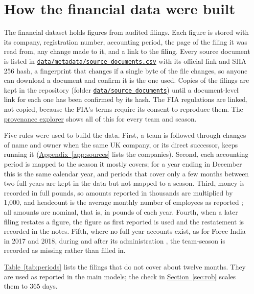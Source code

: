 \documentclass[11pt,a4paper]{article}
\newcommand{\site}{https://nahianibnat-2000.github.io/F1-moneyball}
\newcommand{\repo}{https://github.com/NahianIbnat-2000/F1-moneyball}
\newcommand{\sitepage}[2]{\href{\site/#1}{#2}}
\newcommand{\code}[1]{\href{\repo/blob/main/#1}{\nolinkurl{#1}}}
\begin{document}
\FloatBarrier
\section{How the financial data were built}
\label{app:construction}

\noindent The financial dataset holds \NFinFigures{} figures from \NFilings{} audited filings. Each figure is stored with its
company, registration number, accounting period, the page of the filing it was read from, any change made to it, and a link
to the filing. Every source document is listed in \code{data/metadata/source_documents.csv} with its official link and
SHA-256 hash, a fingerprint that changes if a single byte of the file changes, so anyone can download a document and confirm
it is the one used. Copies of the filings are kept in the repository (folder \code{data/source_documents}) until a
document-level link for each one has been confirmed by its hash. The FIA regulations are linked, not copied, because the
FIA's terms require its consent to reproduce them. The \sitepage{provenance}{provenance explorer} shows all of this for every team
and season.

Five rules were used to build the data. First, a team is followed through changes of name and owner
when the same UK company, or its direct successor, keeps running it (\hyperref[app:sources]{Appendix~\ref*{app:sources}}
lists the companies). Second, each accounting period is mapped to the season it mostly covers; for a year ending in
December this is the same calendar year, and periods that cover only a few months between two full years are kept in the
data but not mapped to a season. Third, money is recorded in full pounds, so amounts reported in thousands are multiplied by
1,000, and headcount is the average monthly number of employees as reported \citep[s.~411(3)]{companiesact2006}; all
amounts are nominal, that is, in pounds of each year. Fourth, when a later filing restates a figure, the figure as first
reported is used and the restatement is recorded in the notes. Fifth, where no full-year accounts exist, as for Force India
in 2017 and 2018, during and after its administration \citep{ch_forceindia}, the team-season is recorded as missing rather
than filled in.

\hyperref[tab:periods]{Table~\ref*{tab:periods}} lists the filings that do not cover about twelve months. They are used
as reported in the main models; the check in \hyperref[sec:rob]{Section~\ref*{sec:rob}} scales them to 365 days.
\end{document}
